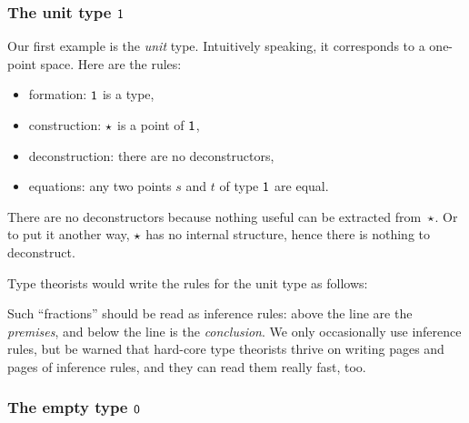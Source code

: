 \documentclass{article}
\begin{document}
\subsubsection{The unit type $\mathsf{1}$}

Our first example is the \emph{unit} type. Intuitively speaking, it corresponds to a one-point space. Here are the rules:
%
\begin{itemize}
\item formation: $\mathsf{1}$ is a type,
\item construction: $\star$ is a point of $\mathsf{1}$,
\item deconstruction: there are no deconstructors,
\item equations: any two points $s$ and $t$ of type $\mathsf{1}$ are equal.
\end{itemize}
%
There are no deconstructors because nothing useful can be extracted from~$\star$.
Or to put it another way, $\star$ has no internal structure, hence there is
nothing to deconstruct.

Type theorists would write the rules for the unit type as follows:
%
%
Such ``fractions'' should be read as inference rules: above the line are the
\emph{premises}, and below the line is the \emph{conclusion}. We only
occasionally use inference rules, but be warned that hard-core type theorists
thrive on writing pages and pages of inference rules, and they can read them
really fast, too.

\subsubsection{The empty type $\mathsf{0}$}
\end{document}
